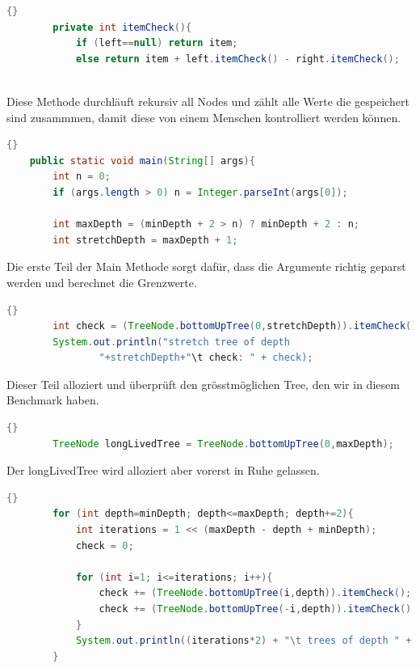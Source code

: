 \documentclass{fancydocument}
\begin{document}
\begin{lstlisting}[language=java,caption=Tree check]{}
		private int itemCheck(){
			if (left==null) return item;
			else return item + left.itemCheck() - right.itemCheck();
		
\end{lstlisting}

Diese Methode durchl\"auft rekursiv all Nodes und z\"ahlt alle Werte
die gespeichert sind zusammmen, damit diese von einem Menschen kontrolliert
werden können.
\\
\begin{lstlisting}[language=java,caption=Argumente und Tiefenrechnung]{}
	public static void main(String[] args){
		int n = 0;
		if (args.length > 0) n = Integer.parseInt(args[0]);
		
		int maxDepth = (minDepth + 2 > n) ? minDepth + 2 : n;
		int stretchDepth = maxDepth + 1;
\end{lstlisting}

Die erste Teil der Main Methode sorgt daf\"ur, dass die Argumente
richtig geparst werden und berechnet die Grenzwerte.

\begin{lstlisting}[language=java,caption=Memory streckung]{}
		int check = (TreeNode.bottomUpTree(0,stretchDepth)).itemCheck();
		System.out.println("stretch tree of depth
                "+stretchDepth+"\t check: " + check);
\end{lstlisting}

Dieser Teil alloziert und \"uberpr\"uft den grösstmöglichen Tree, den wir in diesem
Benchmark haben.

\begin{lstlisting}[language=java,caption=Long-Lived-Tree]{}
		TreeNode longLivedTree = TreeNode.bottomUpTree(0,maxDepth);
\end{lstlisting}

Der longLivedTree wird alloziert aber vorerst in Ruhe gelassen.

\begin{lstlisting}[language=java,caption=Main Loop]{}
		for (int depth=minDepth; depth<=maxDepth; depth+=2){
			int iterations = 1 << (maxDepth - depth + minDepth);
			check = 0;
			
			for (int i=1; i<=iterations; i++){
				check += (TreeNode.bottomUpTree(i,depth)).itemCheck();
				check += (TreeNode.bottomUpTree(-i,depth)).itemCheck();
			}
			System.out.println((iterations*2) + "\t trees of depth " + depth + "\t check: " + check);
		}	
\end{lstlisting}
\end{document}
